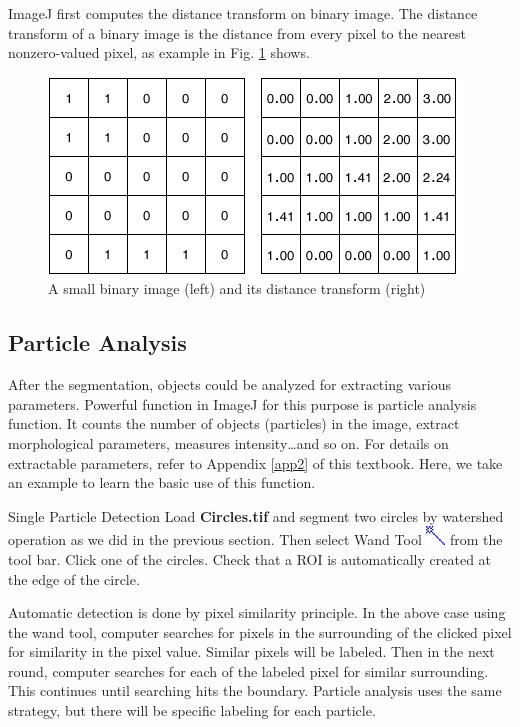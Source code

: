 ImageJ first computes the distance transform on binary image. The distance transform of
a binary image is the distance from every pixel to the nearest nonzero-valued pixel, as example in Fig. \ref{fig:img118} shows.
\begin{figure}[htbp]
\begin{center}
\includegraphics[width=10.85cm,height=5.242cm]{img/CMCIBasicCourse201102-img118.png}
\caption{ A small binary image (left) and its distance transform (right)}
\label{fig:img118}
\end{center}
\end{figure}


\subsection{Particle Analysis}

After the segmentation, objects could be analyzed for extracting various
parameters. Powerful function in ImageJ for this purpose is particle
analysis function. It counts the number of objects (particles) in the
image, extract morphological parameters, measures intensity\ldots and
so on. For details on extractable parameters, refer to Appendix
\ref{app2} of this textbook. Here, we take an example to learn the basic use of
this function.  

\begin{indentexercise}{1}
Single Particle Detection
Load \textbf{Circles.tif} and segment two circles by watershed operation
as we did in the previous section. Then select Wand Tool 
\includegraphics[width=0.5cm]{img/CMCIBasicCourse201102-img119.png}
 from the tool bar. Click one of the circles. Check that a ROI is
automatically created at the edge of the circle.
\end{indentexercise}

Automatic detection is done by pixel similarity principle. In the above
case using the wand tool, computer searches for pixels in the
surrounding of the clicked pixel for similarity in the pixel value.
Similar pixels will be labeled. Then in the next round, computer
searches for each of the labeled pixel for similar surrounding. This
continues until searching hits the boundary. Particle analysis uses the
same strategy, but there will be specific labeling for each particle.

